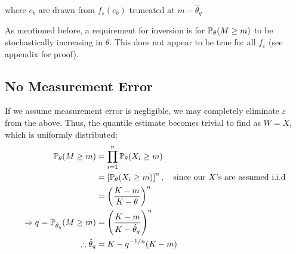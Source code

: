 where $e_b$ are drawn from $f_\varepsilon(e_b)$ truncated at $m-\hat\theta_q$

As mentioned before, a requirement for inversion is for $\mathbb{P}_{\theta} (M \geq m)$ to be stochastically increasing in $\theta$. This does not appear to be true for all $f_\varepsilon$ (see appendix for proof).

\subsection{No Measurement Error}

If we assume measurement error is negligible, we may completely eliminate $\varepsilon$ from the above. Thus, the quantile estimate becomes trivial to find as $W = X$, which is uniformly distributed:
\begin{align*}
    \mathbb{P}_\theta (M \geq m)
        &= \prod_{i=1}^n \mathbb{P}_\theta (X_i \geq m) \\
        &= \left[ \mathbb{P}_\theta (X_i \geq m) \right]^n, \quad \text{since our $X$'s are assumed i.i.d}\\
        &= \left( \frac{K - m}{K - \theta} \right)^n \\
    \Rightarrow q = \mathbb{P}_{\hat{\theta}_q}(M \geq m) &= \left( \frac{K - m}{K - \hat{\theta}_q} \right)^n \\
    \therefore \hat{\theta}_q &= K - q^{-1/n} (K-m)
\end{align*}